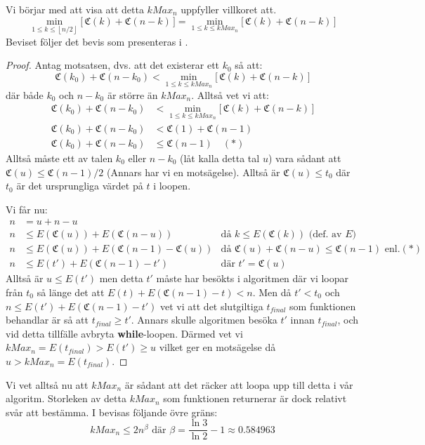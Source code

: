\documentclass[a4paper,titlepage]{article}
\providecommand{\floor}[1]{\left \lfloor #1 \right \rfloor }
\newcommand{\C}[1]{\mathfrak C \left( #1 \right)}
\theoremstyle{definition}
\begin{document}
    Vi börjar med att visa att detta $kMax_n$ uppfyller villkoret att.
    $$\min_{1 \leq k \leq \floor{n/2}}\bigg[\,\C{k} + \C{n-k} \,\bigg] = \min_{1 \leq k \leq kMax_n}\bigg[\, \C{k} + \C{n-k}\,\bigg]$$
    Beviset följer det bevis som presenteras i \cite{algorithm_lune}.
    \begin{proof}
        Antag motsatsen, dvs. att det existerar ett $k_0$ så att:
        $$\C{k_0} + \C{n-k_0} < \min_{1 \leq k \leq kMax_n}\bigg[\, \C{k} + \C{n-k} \,\bigg]$$
        där både $k_0$ och $n-k_0$ är större än $kMax_n$.
        Alltså vet vi att:
        \begin{align*}
            \C{k_0} + \C{n-k_0} &< \min_{1 \leq k \leq kMax_n}\bigg[\, \C{k} + \C{n-k}\,\bigg] \\
            \C{k_0} + \C{n-k_0} &< \C{1} + \C{n-1} \\
            \C{k_0} + \C{n-k_0} &\le \C{n-1} \quad (*)
        \end{align*}
        Alltså måste ett av talen $k_0$ eller $n-k_0$ (låt kalla detta tal $u$)
        vara sådant att $\C{u} \le \C{n-1}/2$ (Annars har vi en motsägelse).
        Alltså är $\C{u}\le t_0$ där $t_0$ är det ursprungliga värdet på $t$ i
        loopen.
        
        Vi får nu:
        \begin{align*}
            n &= u + n-u & \\
            n &\le E(\C{u})+E(\C{n-u}) & \text{då $k\le E(\C{k})$ (def. av $E$)}\\
            n &\le E(\C{u})+E(\C{n-1}-\C{u}) & \text{då } \C{u}+\C{n-u}\le
            \C{n-1} \text{ enl.} (*) \\
            n &\le E(t')+E(\C{n-1}-t') & \text{där } t' = \C{u} 
        \end{align*}
        Alltså är $u\le E(t')$ men detta $t'$ måste har besökts i algoritmen där
        vi loopar från $t_0$ så länge det att $E(t)+E(\C{n-1}-t) < n$. Men då $t' <
        t_0$ och $n \le E(t')+E(\C{n-1}-t')$ vet vi att det slutgiltiga $t_{final}$ som
        funktionen behandlar är så att  $t_{final} \ge t'$. Annars skulle
        algoritmen besöka $t'$ innan $t_{final}$, och vid detta tillfälle
        avbryta \textbf{while}-loopen. 
        Därmed vet vi $kMax_n = E(t_{final}) > E(t') \ge u$ vilket ger en
        motsägelse då $u > kMax_n = E(t_{final})$.
    \end{proof}

    Vi vet alltså nu att $kMax_n$ är sådant att det räcker att loopa upp till
    detta i vår algoritm.
    Storleken av detta $kMax_n$ som funktionen returnerar är dock relativt svår att
    bestämma. I \cite{algorithm_lune} bevisas följande övre gräns:
    $$ kMax_n \le 2n^\beta \text{ där } \beta = \frac{\ln 3}{\ln 2} - 1 \approx
    0.584963$$
\end{document}
